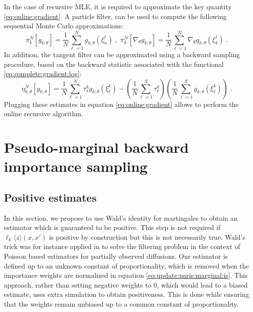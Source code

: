 \documentclass[12pt]{article}
\newcommand{\md}[1]{g_{#1}}
\newcommand{\pred}[1]{\pi_{#1}}
\newcommand{\parvec}{\theta}
\newcommand{\deriv}{\nabla_{\parvec}}
\newcommand{\N}{N}
\newcommand{\eqsp}{\;}
\newcommand{\epart}[2]{\ensuremath{\xi_{#1}^{#2}}}
\newcommand{\hatqg}[1]{\mathsf{\ell}_{#1}}
\begin{document}
In the case of recursive MLE, it is required to approximate the key quantity \eqref{eq:online:gradient}.
A particle filter, can be used to compute the following sequential Monte Carlo approximations:
$$
\pred{k}^N[\md{k;\parvec}] = \frac{1}{N}\sum_{\ell = 1}^N \md{k;\parvec}(\epart{n}{\ell})\eqsp,\eqsp \pred{k}^N[\deriv \md{k;\parvec}] = \frac{1}{N}\sum_{\ell = 1}^N \deriv \md{k;\parvec}(\epart{k}{\ell})\eqsp.
$$
In addition, the tangent filter can be approximated using a backward sampling procedure, based on the backward statistic associated with  the functional \eqref{eq:complete:gradient:log}:
\begin{equation} 
\label{eq:tangent:identity:part:linear}
\eta_{k;\parvec}^{N}[\md{k;\parvec}] = \frac{1}{\N}\sum_{\ell=1}^\N\tau_\ell^k \md{k;\parvec}
(\epart{\ell}{k}) - \left(\frac{1}{\N}\sum_{\ell=1}^\N\tau_\ell^k\right)\left(\frac{1}{\N}\sum_{\ell=1}^\N \md{k;\parvec}(\epart{\ell}{k})\right)\eqsp.
\end{equation}
Plugging these estimates in equation \eqref{eq:online:gradient} allows to perform the online recursive algorithm. 

\section{Pseudo-marginal backward importance sampling}
\label{sec:backwardis}

\subsection{Positive estimates}
\label{sec:wald:trick}
In this section, we propose to use Wald’s identity for martingales to obtain an  estimator which is guaranteed to be positive.  This step is not required if $\hatqg{k}\langle z\rangle(x,x')$ is positive by construction but this is not necessarily true.
 Wald's trick was for instance applied in \cite{fearnhead2010random} to solve the filtering problem in the context of Poisson based estimators for partially observed diffusions. Our estimator is defined up to an unknown constant of proportionality, which is removed when the importance weights are normalized in equation \eqref{eq:update:paris:marginal:is}. 
This approach, rather than setting negative weights to 0, which would lead to a biased estimate, uses extra simulation to obtain positiveness. 
This is done while ensuring that the weights remain unbiased up to a common constant of proportionality.
\end{document}
